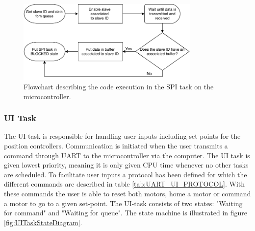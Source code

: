 \documentclass[../../main.tex]{subfiles}
\begin{document}
\begin{figure}[H]
    \centering
    \includegraphics[width=0.8\textwidth]{Sections/System_Implementation/Images/SPIFlowchart.pdf}
    \caption{Flowchart describing the code execution in the SPI task on the microcontroller.}
    \label{fig:SPIFlowchart}
\end{figure}

\subsubsection*{UI Task}
The UI task is responsible for handling user inputs including set-points for the position controllers. Communication is initiated when the user transmits a command through UART to the microcontroller via the computer. The UI task is given lowest priority, meaning it is only given CPU time whenever no other tasks are scheduled. To facilitate user inputs a protocol has been defined for which the different commands are described in table \ref{tab:UART_UI_PROTOCOL}. With these commands the user is able to reset both motors, home a motor or command a motor to go to a given set-point. The UI-task consists of two states: "Waiting for command" and "Waiting for queue". The state machine is illustrated in figure
\ref{fig:UITaskStateDiagram}. 
\end{document}
